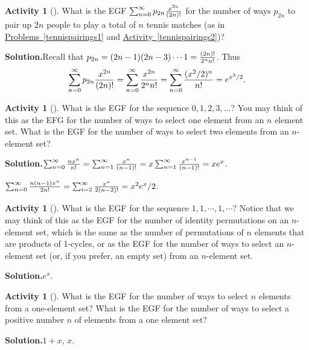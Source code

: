 \documentclass[10pt,]{book}
\theoremstyle{plain}
\theoremstyle{definition}
\newtheorem{activity}[project]{Activity}
\numberwithin{equation}{chapter}
\begin{document}
\begin{activity}[]\label{exponentialtennisparings}
What is the EGF \(\sum_{n=0}^\infty
p_{2n}{x^{2n}\over (2n)!}\) for the number of ways \(p_{2n}\) to pair up \(2n\) people to play a total of \(n\) tennis matches (as in \hyperref[tennispairings1]{Problems~\ref{tennispairings1}} and \hyperref[tennispairings2]{Activity~\ref{tennispairings2}})?%
\par\medskip\noindent%
\textbf{Solution.}\quad Recall that \(p_{2n} = (2n-1)(2n-3)\cdots 1= {(2n)!\over 2^n
n!}\). Thus%
\begin{equation*}
\sum_{n=0}^\infty
p_{2n}{x^{2n}\over (2n)!}= \sum_{n=0}^\infty {x^{2n}\over 2^n n!} =
\sum_{n=0 }^\infty {({x^2/2})^n\over n!} = e^{x^2/2} .
\end{equation*}
%
\end{activity}
\begin{activity}[]\label{activity-83}
What is the EGF for the sequence \(0,1,2,3,\ldots\)? You may think of this as the EFG for the number of ways to select one element from an \(n\) element set. What is the EGF for the number of ways to select two elements from an \(n\)-element set?%
\par\medskip\noindent%
\textbf{Solution.}\quad \(\sum_{n=0}^\infty{ nx^n\over n!}=\sum_{n=1}^\infty{
x^n\over(n-1)!}=x\sum_{n=1}^\infty{ x^{n-1}\over(n-1)!}=xe^x\).%
\par
\(\sum_{n=0}^\infty{ n(n-1)x^n\over 2 n!}=\sum_{i=2}^\infty {x^n\over
2(n-2)!}=x^2e^x/2\).%
\end{activity}
\begin{activity}[]\label{allonessequence}
What is the EGF for the sequence \(1,1,\cdots,1,\cdots\)? Notice that we may think of this as the EGF for the number of identity permutations on an \(n\)-element set, which is the same as the number of permutations of \(n\) elements that are products of 1-cycles, or as the EGF for the number of ways to select an \(n\)-element set (or, if you prefer, an empty set) from an \(n\)-element set.%
\par\medskip\noindent%
\textbf{Solution.}\quad \(e^x\).%
\end{activity}
\begin{activity}[]\label{activity-85}
What is the EGF for the number of ways to select \(n\) elements from a one-element set? What is the EGF for the number of ways to select a positive number \(n\) of elements from a one element set?%
\par\medskip\noindent%
\textbf{Solution.}\quad \(1+x\), \(x\).%
\end{activity}
\end{document}
